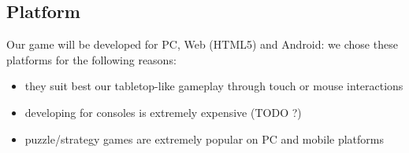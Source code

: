 \subsection{Platform}
Our game will be developed for PC, Web (HTML5) and Android: we chose these platforms for the following reasons:
\begin{itemize}
	\item they suit best our tabletop-like gameplay through touch or mouse interactions
	\item developing for consoles is extremely expensive (TODO ?)
	\item puzzle/strategy games are extremely popular on PC and mobile platforms
\end{itemize}